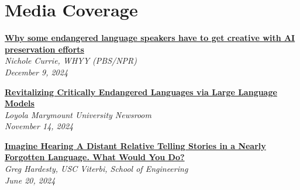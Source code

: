 \documentclass[letterpaper,11pt]{article}
\newenvironment{benumerate}[2][]{
    \let\oldItem\item
    \def\item{\addtocounter{enumi}{-2}\oldItem}
    \begin{enumerate}[#1]
    \setcounter{enumi}{#2}
    \addtocounter{enumi}{1}
}{
    \end{enumerate}
}
\newcommand{\pendingpub}[3]{
  \vspace{-1pt}\item[] \textbf{#1} \\ 
    \textit{\small#2} \\
    \textit{\small#3}\vspace{-5pt}
}
\newcommand{\pubListStart}[1]{\begin{benumerate}[leftmargin=*,label={[\arabic*]}]{#1}}
\newcommand{\pubListEnd}{\end{benumerate}}
\begin{document}
\section{Media Coverage}
\pubListStart{1}

  \pendingpub
  {\href{https://whyy.org/segments/endangered-language-speakers-get-creative-with-ai/}{Why some endangered language speakers have to get creative with AI preservation efforts}}
  {Nichole Currie, WHYY (PBS/NPR)}
  {December 9, 2024}

  \pendingpub
  {\href{https://newsroom.lmu.edu/campusnews/revitalizing-critically-endangered-languages-via-large-language-models/}{Revitalizing Critically Endangered Languages via Large Language Models}}
  {Loyola Marymount University Newsroom}
  {November 14, 2024}

  \pendingpub
  {\href{https://viterbischool.usc.edu/news/2024/06/imagine-hearing-a-distant-relative-telling-stories-in-a-nearly-forgotten-language-what-would-you-do/}{Imagine Hearing A Distant Relative Telling Stories in a Nearly Forgotten Language. What Would You Do?}}
  {Greg Hardesty, USC Viterbi, School of Engineering}
  {June 20, 2024}

\pubListEnd


\end{document}
